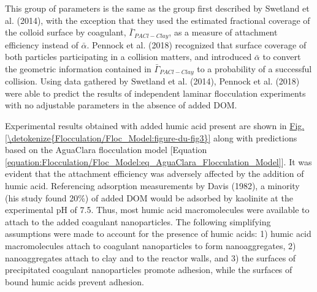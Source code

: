 \documentclass[letterpaper,10pt,english]{sphinxmanual}
\begin{document}
This group of parameters is the same as the group first described by Swetland et al. (2014), with the exception that they used the estimated fractional coverage of the colloid surface by coagulant, \({\bar{\Gamma}}_{PACl-Clay}\), as a measure of attachment efficiency instead of \(\bar{\alpha }\). Pennock et al. (2018) recognized that surface coverage of both particles participating in a collision matters, and introduced \(\bar{\alpha }\) to convert the geometric information contained in \({\bar{\Gamma}}_{PACl-Clay}\) to a probability of a successful collision. Using data gathered by Swetland et al. (2014), Pennock et al. (2018) were able to predict the results of independent laminar flocculation experiments with no adjustable parameters in the absence of added DOM.

Experimental results obtained with added humic acid present are shown in \hyperref[\detokenize{Flocculation/Floc_Model:figure-du-fig3}]{Fig.\@ \ref{\detokenize{Flocculation/Floc_Model:figure-du-fig3}}} along with predictions based on the AguaClara flocculation model {[}Equation \eqref{equation:Flocculation/Floc_Model:eq_AguaClara_Flocculation_Model}{]}.  It was evident that the attachment efficiency was adversely affected by the addition of humic acid.  Referencing adsorption measurements by Davis (1982), a minority (his study found 20\%) of added DOM would be adsorbed by kaolinite at the experimental pH of 7.5. Thus, most humic acid macromolecules were available to attach to the added coagulant nanoparticles. The following simplifying assumptions were made to account for the presence of humic acids: 1) humic acid macromolecules attach to coagulant nanoparticles to form nanoaggregates, 2) nanoaggregates attach to clay and to the reactor walls, and 3) the surfaces of precipitated coagulant nanoparticles promote adhesion, while the surfaces of bound humic acids prevent adhesion.
\end{document}
